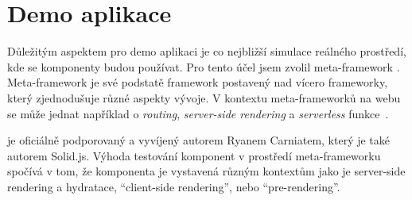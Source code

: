 \section{Demo aplikace}

Důležitým aspektem pro demo aplikaci je co nejbližší simulace reálného prostředí, kde se komponenty budou používat.
Pro tento účel jsem zvolil meta-framework . Meta-framework je své podstatě framework postavený nad vícero frameworky, který zjednodušuje různé aspekty vývoje.
V kontextu meta-frameworků na webu se může jednat například o \textit{routing}, \textit{server-side rendering} a \textit{serverless} funkce~\cite{prismic-metaframework}.

 je oficiálně podporovaný a vyvíjený autorem Ryanem Carniatem, který je také autorem Solid.js.
Výhoda testování komponent v prostředí meta-frameworku spočívá v tom, že komponenta je vystavená různým kontextům jako je server-side rendering a hydratace, ``client-side rendering'', nebo ``pre-rendering''.
